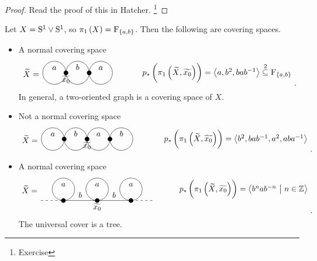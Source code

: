 \begin{proof}
Read the proof of this in Hatcher. \footnote{Exercise}
\end{proof}

\pagebreak

\begin{example*}
Let $ X = \S^1 \vee \S^1 $, so $ \pi_1\br{X} = \F_{\cbr{a, b}} $. Then the following are covering spaces.
\begin{itemize}
\item A normal covering space
$$
\begin{tikzpicture}
\draw (-1, 0) node{$ \widetilde{X} = $};
\draw (0, 0) circle (0.5) node[above]{$ a $};
\fill (0.5, 0) circle (0.1) node[below]{$ \widetilde{x_0} $};
\draw (1, 0) circle (0.5) node[above]{$ b $};
\fill (1.5, 0) circle (0.1);
\draw (2, 0) circle (0.5) node[above]{$ a $};
\draw (7, 0) node{$ p_*\br{\pi_1\br{\widetilde{X}, \widetilde{x_0}}} = \abr{a, b^2, bab^{-1}} \overset{2}{\subseteq} \F_{\cbr{a, b}} $};
\end{tikzpicture}.
$$
In general, a two-oriented graph is a covering space of $ X $.
\item Not a normal covering space
$$
\begin{tikzpicture}
\draw (-1, 0) node{$ \widetilde{X} = $};
\draw (0, 0) circle (0.5) node[above]{$ a $};
\fill (0.5, 0) circle (0.1);
\draw (1, 0) circle (0.5) node[above]{$ b $};
\fill (1.5, 0) circle (0.1) node[below]{$ \widetilde{x_0} $};
\draw (2, 0) circle (0.5) node[above]{$ a $};
\fill (2.5, 0) circle (0.1);
\draw (3, 0) circle (0.5) node[above]{$ b $};
\draw (8, 0) node{$ p_*\br{\pi_1\br{\widetilde{X}, \widetilde{x_0}}} = \abr{b^2, bab^{-1}, a^2, aba^{-1}} $};
\end{tikzpicture}.
$$
\item A normal covering space
$$
\begin{tikzpicture}
\draw (-0.5, 0) node{$ \widetilde{X} = $};
\draw [dashed] (0, -0.5) to (1, -0.5);
\fill (1, -0.5) circle (0.1);
\draw (1, 0) circle (0.5) node[above]{$ a $};
\draw (1, -0.5) to node[above]{$ b $} (2.5, -0.5);
\fill (2.5, -0.5) circle (0.1) node[below]{$ \widetilde{x_0} $};
\draw (2.5, 0) circle (0.5) node[above]{$ a $};
\draw (2.5, -0.5) to node[above]{$ b $} (4, -0.5);
\fill (4, -0.5) circle (0.1);
\draw (4, 0) circle (0.5) node[above]{$ a $};
\draw [dashed] (4, -0.5) to (5, -0.5);
\draw (9, 0) node{$ p_*\br{\pi_1\br{\widetilde{X}, \widetilde{x_0}}} = \abr{b^nab^{-n} \st n \in \ZZ} $};
\end{tikzpicture}.
$$
The universal cover is a tree.
\end{itemize}
\end{example*}

